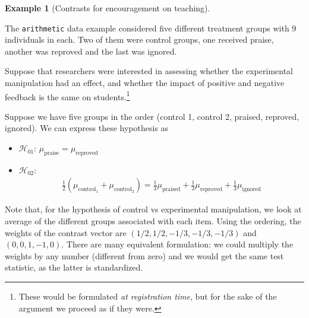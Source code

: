 \documentclass[
  11pt,
  letterpaper,
]{scrbook}
\providecommand{\tightlist}{%
  \setlength{\itemsep}{0pt}\setlength{\parskip}{0pt}}\usepackage{longtable,booktabs,array}
\theoremstyle{definition}
\theoremstyle{definition}
\newtheorem{example}{Example}[chapter]
\theoremstyle{remark}
\begin{document}
\begin{example}[Contrasts for encouragement on
teaching]\protect\hypertarget{exm-contrast-teaching}{}\label{exm-contrast-teaching}

The \texttt{arithmetic} data example considered five different treatment
groups with 9 individuals in each. Two of them were control groups, one
received praise, another was reproved and the last was ignored.

Suppose that researchers were interested in assessing whether the
experimental manipulation had an effect, and whether the impact of
positive and negative feedback is the same on students.\footnote{These
  would be formulated \emph{at registration time}, but for the sake of
  the argument we proceed as if they were.}

Suppose we have five groups in the order (control 1, control 2, praised,
reproved, ignored). We can express these hypothesis as

\begin{itemize}
\tightlist
\item
  \(\mathscr{H}_{01}\): \(\mu_{\text{praise}} = \mu_{\text{reproved}}\)
\item
  \(\mathscr{H}_{02}\): \begin{align*}
  \frac{1}{2}(\mu_{\text{control}_1}+\mu_{\text{control}_2}) = \frac{1}{3}\mu_{\text{praised}} + \frac{1}{3}\mu_{\text{reproved}} + \frac{1}{3}\mu_{\text{ignored}}
  \end{align*}
\end{itemize}

Note that, for the hypothesis of control vs experimental manipulation,
we look at average of the different groups associated with each item.
Using the ordering, the weights of the contrast vector are
\((1/2, 1/2, -1/3, -1/3, -1/3)\) and \((0, 0, 1, -1, 0)\). There are
many equivalent formulation: we could multiply the weights by any number
(different from zero) and we would get the same test statistic, as the
latter is standardized.


\end{example}
\end{document}
